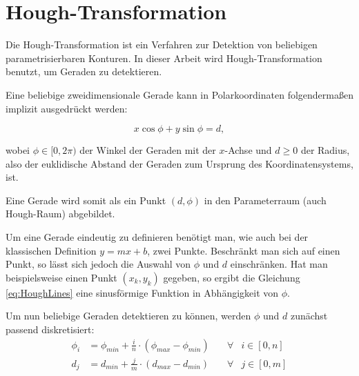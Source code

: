 
\section{Hough-Transformation}
\label{s:hough}
Die Hough-Transformation ist ein Verfahren zur Detektion von beliebigen parametrisierbaren Konturen. In dieser Arbeit wird Hough-Transformation benutzt, um Geraden zu detektieren.

Eine beliebige zweidimensionale Gerade kann in Polarkoordinaten folgendermaßen implizit ausgedrückt werden:

\begin{equation}\label{eq:HoughLines}
x\cos\phi + y\sin\phi = d,
\end{equation}

wobei $\phi \in [0,2\pi)$ der Winkel der Geraden mit der $x$-Achse und $d \geq 0$ der Radius, also der euklidische Abstand der Geraden zum Ursprung des Koordinatensystems, ist.

Eine Gerade wird somit als ein Punkt $(d,\phi)$ in den Parameterraum (auch Hough-Raum) abgebildet.

Um eine Gerade eindeutig zu definieren benötigt man, wie auch bei der klassischen Definition $y = mx + b$, zwei Punkte. Beschränkt man sich auf einen Punkt, so lässt sich jedoch die Auswahl von $\phi$ und $d$ einschränken. Hat man beispielsweise einen Punkt $(x_k,y_k)$ gegeben, so ergibt die Gleichung \ref{eq:HoughLines} eine sinusförmige Funktion in Abhängigkeit von $\phi$.

Um nun beliebige Geraden detektieren zu können, werden $\phi$ und $d$ zunächst passend diskretisiert:
\[
	\begin{aligned}
		\phi_i &= \phi_{min} + \frac{i}{n} \cdot (\phi_{max} - \phi_{min}) \quad&\forall &i\in [0,n]\\
		d_j &= d_{min} + \frac{j}{m} \cdot  (d_{max} - d_{min}) &\forall &j\in [0,m]
	\end{aligned}
\]




